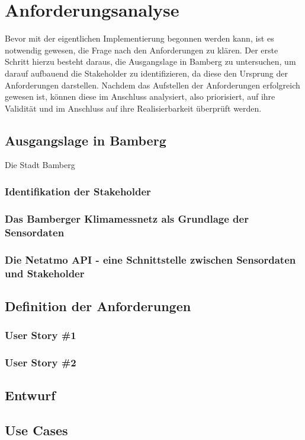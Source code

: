 \chapter{Anforderungsanalyse} %
Bevor mit der eigentlichen Implementierung begonnen werden kann, ist es notwendig gewesen, die Frage nach den Anforderungen zu klären. Der erste Schritt 
hierzu besteht daraus, die Ausgangslage in Bamberg zu untersuchen, um darauf aufbauend die Stakeholder zu identifizieren, da diese den Ursprung der Anforderungen 
darstellen. Nachdem das Aufstellen der Anforderungen erfolgreich gewesen ist, können diese im Anschluss analysiert, also priorisiert, auf ihre Validität und im Anschluss 
auf ihre Realisierbarkeit überprüft werden.

\section{Ausgangslage in Bamberg}
Die Stadt Bamberg

\subsection{Identifikation der Stakeholder}
\label{sec:stakeholder}

\subsection{Das Bamberger Klimamessnetz als Grundlage der Sensordaten}

\subsection{Die Netatmo API - eine Schnittstelle zwischen Sensordaten und Stakeholder}

\section{Definition der Anforderungen}

\subsection{User Story \#1}

\subsection{User Story \#2}

\section{Entwurf}

\section{Use Cases}